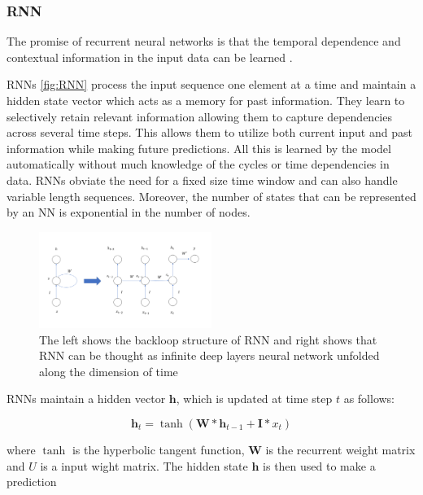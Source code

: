 \documentclass[5p]{elsarticle}
\begin{document}
\subsubsection{RNN}
The promise of recurrent neural networks is that the temporal dependence and contextual
information in the input data can be learned\cite{Bengio1994LearningDifficult} \cite{ChoLearningTranslation}. 

RNNs \ref{fig:RNN} process the input sequence one element at a time and maintain a hidden
state vector which acts as a memory for past information. They learn to selectively retain relevant information allowing them to capture dependencies across several time steps. This allows them to utilize both current input and past information while making future predictions. All this is learned by the model automatically without much knowledge of the cycles or time dependencies in data. RNNs obviate the need for a fixed size time window and can also handle variable length sequences. Moreover, the number of states that can be represented by an NN is exponential in the number of nodes.

 
\begin{figure}[h]
    \centering
    \includegraphics[width=0.5\textwidth]{RNN.png}
    \caption{The left shows the backloop structure of RNN and right shows that RNN can be thought as infinite deep layers neural network unfolded along the dimension of time}
    \label{fig:RNN can be thought as infinite deep layers neural network along the dimensions of time}
\end{figure}


RNNs maintain a hidden vector $\mathbf h$, which is updated at time step $t$ as follows:

\begin{equation}
	\mathbf h_t = \tanh(\mathbf W * \mathbf h_{t-1} + \mathbf I * x_t)
\end{equation}

where $\tanh$ is the hyperbolic tangent function, $\mathbf W$ is the recurrent weight matrix and $U$ is a input wight matrix. The hidden state $\mathbf h$ is then used to make a prediction
\end{document}
